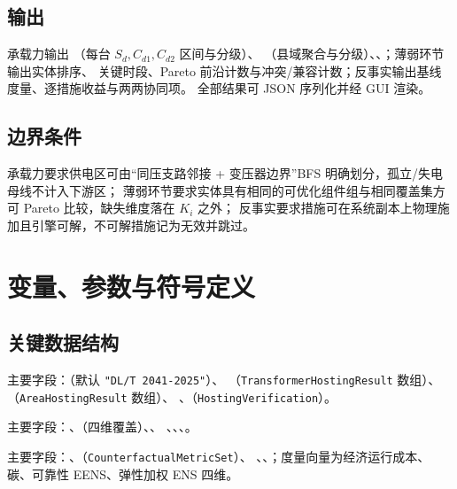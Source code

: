 \documentclass[UTF8,fontset=fandol,a4paper,11pt]{ctexart}
\begin{document}
\subsection{输出}
承载力输出 （每台 $S_d,C_{d1},C_{d2}$ 区间与分级）、
（县域聚合与分级）、、；薄弱环节输出实体排序、
关键时段、Pareto 前沿计数与冲突/兼容计数；反事实输出基线度量、逐措施收益与两两协同项。
全部结果可 JSON 序列化并经 GUI 渲染。

\subsection{边界条件}
承载力要求供电区可由“同压支路邻接 + 变压器边界”BFS 明确划分，孤立/失电母线不计入下游区；
薄弱环节要求实体具有相同的可优化组件组与相同覆盖集方可 Pareto 比较，缺失维度落在 $K_i$ 之外；
反事实要求措施可在系统副本上物理施加且引擎可解，不可解措施记为无效并跳过。

\section{变量、参数与符号定义}
\subsection{关键数据结构}
主要字段：（默认 \texttt{"DL/T 2041-2025"}）、
（\texttt{TransformerHostingResult} 数组）、（\texttt{AreaHostingResult} 数组）、
、（\texttt{HostingVerification}）。

主要字段：、（四维覆盖）、、
、、、。

主要字段：、（\texttt{CounterfactualMetricSet}）、
、、；度量向量为经济运行成本、碳、可靠性
EENS、弹性加权 ENS 四维。
\end{document}
